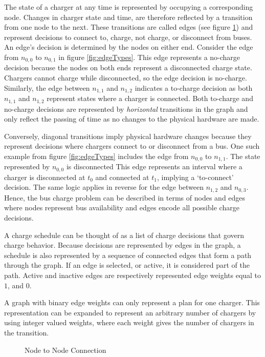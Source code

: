 \par The state of a charger at any time is represented by occupying a corresponding node. Changes in charger state and time, are therefore reflected by a transition from one node to the next. These transitions are called edges (see figure \ref{fig:edgeNodeRel}) and represent decisions to connect to, charge, not charge, or disconnect from buses. An edge's decision is determined by the nodes on either end. Consider the edge from $n_{0,0}$ to $n_{0,1}$ in figure \ref{fig:edgeTypes}. This edge represents a no-charge decision because the nodes on both ends represent a disconnected charge state. Chargers cannot charge while disconnected, so the edge decision is no-charge.  Similarly, the edge between $n_{1,1}$ and $n_{1,2}$ indicates a to-charge decision as both $n_{1,1}$ and $n_{1,2}$ represent states where a charger is connected. Both to-charge and no-charge decisions are represented by \textit{horizontal} transitions in the graph and only reflect the passing of time as no changes to the physical hardware are made.
\par Conversely, diagonal transitions imply physical hardware changes because they represent decisions where chargers connect to or disconnect from a bus. One such example from figure \ref{fig:edgeTypes} includes the edge from $n_{0,0}$ to $n_{1,1}$. The state represented by $n_{0,0}$ is disconnected This edge represents an interval where a charger is disconnected at $t_0$ and connected at $t_1$, implying a `to-connect' decision. The same logic applies in reverse for the edge between $n_{1,2}$ and $n_{0,3}$. Hence, the bus charge problem can be described in terms of nodes and edges where nodes represent bus availability and edges encode all possible charge decisions. 
\par A charge schedule can be thought of as a list of charge decisions that govern charge behavior. Because decisions are represented by edges in the graph, a schedule is also represented by a sequence of connected edges that form a path through the graph. If an edge is selected, or active, it is considered part of the path.  Active and inactive edges are respectively represented edge weights equal to $1$, and $0$.
\par A graph with binary edge weights can only represent a plan for one charger. This representation can be expanded to represent an arbitrary number of chargers by using integer valued weights, where each weight gives the number of chargers in the transition.
\begin{figure}
	\centering
	\caption{Node to Node Connection}
	\label{fig:edgeNodeRel}
\end{figure} 
